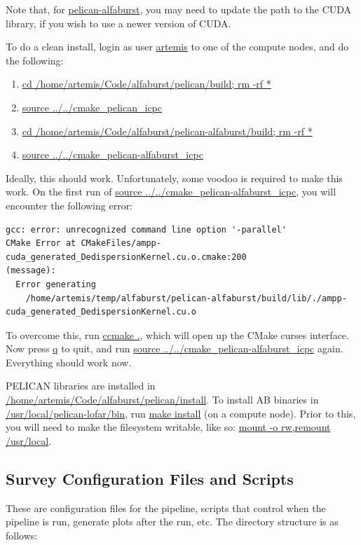 \documentclass{article}
\begin{document}
Note that, for \url{pelican-alfaburst}, you may need to update the path to the
CUDA library, if you wish to use a newer version of CUDA.

To do a clean install, login as user \url{artemis} to one of the compute nodes,
and do the following:

\begin{enumerate}
\item \url{cd /home/artemis/Code/alfaburst/pelican/build; rm -rf *}
\item \url{source ../../cmake_pelican_icpc}
\item \url{cd /home/artemis/Code/alfaburst/pelican-alfaburst/build; rm -rf *}
\item \url{source ../../cmake_pelican-alfaburst_icpc}
\end{enumerate}

Ideally, this should work. Unfortunately, some voodoo is required to make this
work. On the first run of \url{source
../../cmake_pelican-alfaburst_icpc}, you will encounter the following error:

\small {
\begin{verbatim}
gcc: error: unrecognized command line option '-parallel'
CMake Error at CMakeFiles/ampp-cuda_generated_DedispersionKernel.cu.o.cmake:200
(message):
  Error generating
    /home/artemis/temp/alfaburst/pelican-alfaburst/build/lib/./ampp-cuda_generated_DedispersionKernel.cu.o
\end{verbatim}
}

To overcome this, run \url{ccmake .}, which will open up the CMake curses
interface. Now press \url{q} to quit, and run \url{source
../../cmake_pelican-alfaburst_icpc} again. Everything should work now.

PELICAN libraries are installed in
\url{/home/artemis/Code/alfaburst/pelican/install}. To install AB binaries in
\url{/usr/local/pelican-lofar/bin}, run \url{make install} (on a
compute node). Prior to this, you will need to make the filesystem writable,
like so: \url{mount -o rw,remount /usr/local}.


\subsection{Survey Configuration Files and Scripts}

These are configuration files for the pipeline, scripts that control when the
pipeline is run, generate plots after the run, etc. The directory structure is
as follows:
\end{document}
